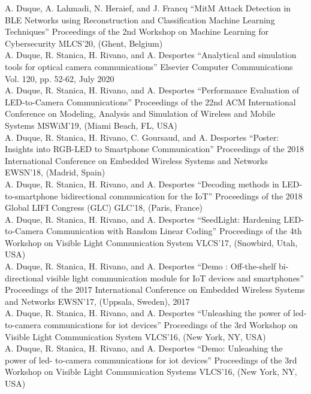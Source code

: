 \documentclass[]{cv-style}          %
\begin{document}
\normalsize
\begin{publist}
\pub
{A. Duque, A. Lahmadi, N. Heraief, and J. Francq}
{“MitM Attack Detection in BLE Networks using Reconstruction and Classification Machine Learning Techniques”}
{Proceedings of the 2nd Workshop on Machine Learning for Cybersecurity}
{MLCS’20, (Ghent, Belgium)}\\
\pub
{A. Duque, R. Stanica, H. Rivano, and A. Desportes}
{“Analytical and simulation tools for optical camera communications”}
{Elsevier Computer Communications}
{Vol. 120, pp. 52-62, July 2020}\\
\pub
{A. Duque, R. Stanica, H. Rivano, and A. Desportes}
{“Performance Evaluation of LED-to-Camera Communications”}
{Proceedings of the 22nd ACM International Conference on Modeling, Analysis and Simulation of Wireless and Mobile Systems}
{MSWiM’19, (Miami Beach, FL, USA)}\\
\pub
{A. Duque, R. Stanica, H. Rivano, C. Goursaud, and A. Desportes}
{“Poster: Insights into RGB-LED to Smartphone Communication”}
{Proceedings of the 2018 International Conference on Embedded Wireless Systems and Networks}
{EWSN’18, (Madrid, Spain)}\\
\pub
{A. Duque, R. Stanica, H. Rivano, and A. Desportes}
{“Decoding methods in LED-to-smartphone bidirectional communication for the IoT”}
{Proceedings of the 2018 Global LIFI Congress (GLC)}
{GLC’18, (Paris, France)}\\
\pub
{A. Duque, R. Stanica, H. Rivano, and A. Desportes}
{“SeedLight: Hardening LED-to-Camera Communication with Random Linear Coding”}
{Proceedings of the 4th Workshop on Visible Light Communication System}
{VLCS’17, (Snowbird, Utah, USA)}\\
\pub
{A. Duque, R. Stanica, H. Rivano, and A. Desportes}
{“Demo : Off-the-shelf bi-directional visible light communication module for IoT devices and smartphones”}
{Proceedings of the 2017 International Conference on Embedded Wireless Systems and Networks}
{EWSN’17, (Uppsala, Sweden), 2017}\\
\pub
  {A. Duque, R. Stanica, H. Rivano, and A. Desportes}
  {“Unleashing the power of led- to-camera communications for iot devices”}
  {Proceedings of the 3rd Workshop on Visible Light Communication System}
  {VLCS’16, (New York, NY, USA)}\\
\pub
  {A. Duque, R. Stanica, H. Rivano, and A. Desportes} {“Demo: Unleashing the power of led- to-camera communications for iot devices”} {Proceedings of the 3rd Workshop on Visible Light Communication Systems} {VLCS’16, (New York, NY, USA)}
\end{publist}
\end{document}
